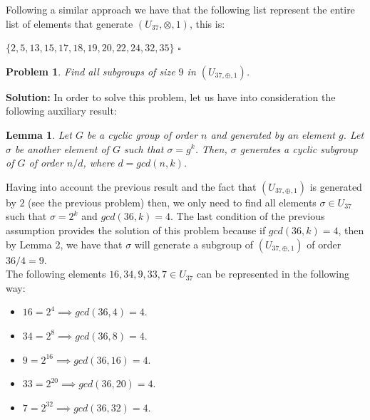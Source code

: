 \documentclass[a4paper,openany,11pt]{book}
\newtheorem{Lemma}{Lemma}
\newtheorem{Prob}{Problem}
\begin{document}
Following a similar approach we have that the following list represent the entire list of elements that generate $(U_{37},\otimes, 1)$, this is:

\begin{center}
	$\lbrace 2, 5, 13, 15, 17, 18, 19, 20, 22, 24 , 32, 35 \rbrace$\hspace{0.1cm} $\square$
\end{center}

\begin{Prob}
	Find all subgroups of size $9$ in $(U_{37,\oplus,1})$.
\end{Prob}

\textbf{Solution:} In order to solve this problem, let us have into consideration the following auxiliary result:

\begin{Lemma}
	Let $G$ be a cyclic group of order $n$ and generated by an element $g$. Let $\sigma$ be another element of $G$ such that $\sigma = g^{k}$. Then, $\sigma$ generates a cyclic subgroup of $G$ of order $n/d$, where $d = gcd(n,k)$.
\end{Lemma}

Having into account the previous result and the fact that $(U_{37,\oplus,1})$ is generated by $2$ (see the previous problem) then, we only need to find all elements $\sigma \in U_{37}$ such that $\sigma = 2^{k}$ and $gcd(36,k) = 4$. The last condition of the previous assumption provides the solution of this problem because if $gcd(36,k) = 4$, then by Lemma 2, we have that $\sigma$ will generate a subgroup of $(U_{37,\oplus,1})$ of order $36/4 = 9$.\\

The following elements $16, 34, 9, 33, 7 \in U_{37}$ can be represented in the following way:

\begin{itemize}
	\item $16 = 2^{4} \implies gcd(36,4) = 4$.
	
	\item $34 = 2^{8} \implies gcd(36,8) = 4$.
	
	\item $9 = 2^{16} \implies gcd(36,16) = 4$.
	
	\item $33 = 2^{20} \implies gcd(36,20) = 4$.
	
	\item $7 = 2^{32} \implies gcd(36,32) = 4$.
\end{itemize}
\end{document}
